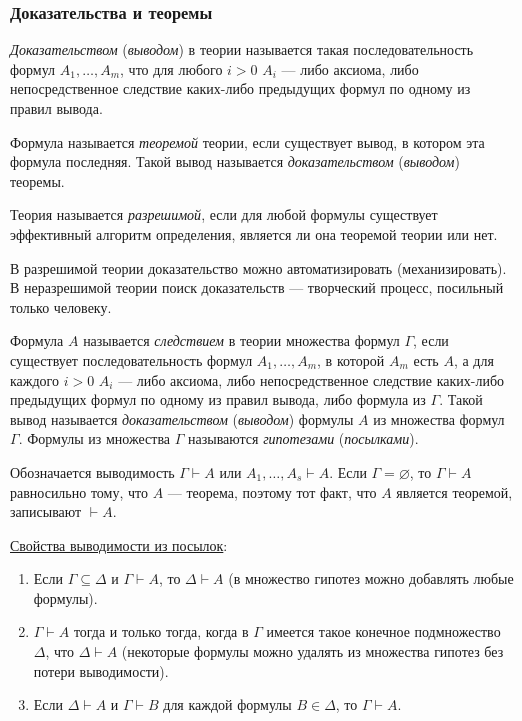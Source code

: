 \subsubsection{Доказательства и теоремы}
\begin{definition*}
    \textit{Доказательством} (\textit{выводом}) в теории называется такая последовательность формул $A_1, \dots, A_m$, что для любого $i  > 0$ $A_i$ --- либо аксиома, либо непосредственное следствие каких-либо предыдущих формул по одному из правил вывода.
\end{definition*}
\begin{definition*}
    Формула называется \textit{теоремой} теории, если существует вывод, в котором эта формула последняя. Такой вывод называется \textit{доказательством} (\textit{выводом}) теоремы. 
\end{definition*}
\begin{definition*}
    Теория называется \textit{разрешимой}, если для любой формулы существует эффективный алгоритм определения, является ли она теоремой теории или нет.
\end{definition*}
В разрешимой теории доказательство можно автоматизировать (механизировать). В неразрешимой теории поиск доказательств --- творческий процесс, посильный только человеку.
\begin{definition*}
    Формула $A$ называется \textit{следствием} в теории множества формул $\Gamma$, если существует последовательность формул $A_1, \dots, A_m$, в которой $A_m$ есть $A$, а для каждого $i > 0$ $A_i$ --- либо аксиома, либо непосредственное следствие каких-либо предыдущих формул по одному из правил вывода, либо формула из $\Gamma$. Такой вывод называется \textit{доказательством} (\textit{выводом}) формулы $A$ из множества формул $\Gamma$. Формулы из множества $\Gamma$ называются \textit{гипотезами} (\textit{посылками}).
\end{definition*}
Обозначается выводимость $\Gamma \vdash A$ или $A_1, \dots, A_s \vdash A$. Если $\Gamma = \varnothing$, то $\Gamma \vdash A$ равносильно тому, что $A$ --- теорема, поэтому тот факт, что $A$ является теоремой, записывают $\vdash A$.

\underline{Свойства выводимости из посылок}:
\begin{enumerate}
    \item Если $\Gamma \subseteq \Delta$ и $\Gamma \vdash A$, то $\Delta \vdash A$ (в множество гипотез можно добавлять любые формулы).
    \item $\Gamma \vdash A$ тогда и только тогда, когда в $\Gamma$ имеется такое конечное подмножество $\Delta$, что $\Delta \vdash A$ (некоторые формулы можно удалять из множества гипотез без потери выводимости).
    \item Если $\Delta \vdash A$ и $\Gamma \vdash B$ для каждой формулы $B \in \Delta$, то $\Gamma \vdash A$.
\end{enumerate}